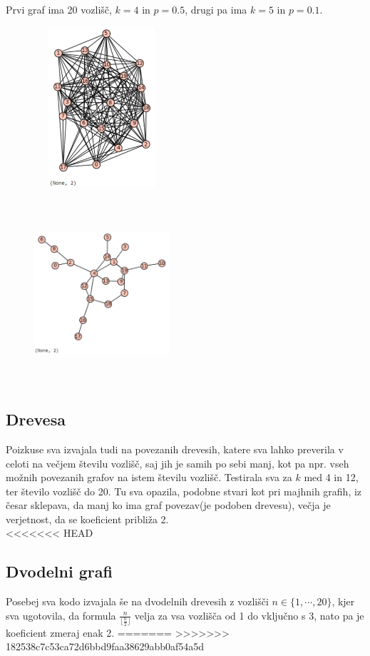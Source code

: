 \documentclass[a4paper]{article}
\begin{document}
Prvi graf ima 20 vozlišč, $k=4$ in $p=0.5$, drugi pa ima $k=5$ in $p=0.1$.
\begin{figure}[h!]
    \centering
    \includegraphics[width=5cm, height=6cm]{Slika5}
    \label{fig:mesh1}
\end{figure}\\
\begin{figure}[h!]
    \centering
    \includegraphics[width=5cm, height=5cm]{Slika6}
    \label{fig:mesh1}
\end{figure}\\

\subsection{Drevesa}

Poizkuse sva izvajala tudi na povezanih drevesih, katere sva lahko preverila v celoti na večjem številu vozlišč, saj jih je samih po sebi manj, kot pa npr. vseh možnih povezanih grafov na istem številu vozlišč. Testirala sva za $k$ med 4 in 12, ter število vozlišč do 20. Tu sva opazila, podobne stvari kot pri majhnih grafih, iz česar sklepava, da manj ko ima graf povezav(je podoben drevesu), večja je verjetnost, da se koeficient približa 2.\\

<<<<<<< HEAD
\subsection{Dvodelni grafi}
Posebej sva kodo izvajala še na dvodelnih drevesih z vozlišči $n \in \{1, \cdots, 20\}$, kjer sva ugotovila, da formula $\frac{n}{\lfloor{\frac{n}{2}}\rfloor}$ velja za vsa vozlišča od 1 do vključno s 3, nato pa je koeficient zmeraj enak 2.
=======
\pagebreak
>>>>>>> 182538c7c53ca72d6bbd9faa38629abb0af54a5d
\end{document}
